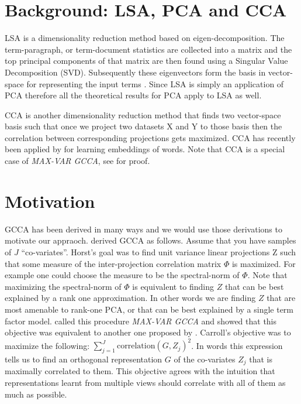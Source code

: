\documentclass[11pt]{article}
\begin{document}
\section{Background: LSA, PCA and CCA}
LSA is a dimensionality reduction method based on
eigen-decomposition. The term-paragraph, or term-document 
statistics are collected into a matrix and the top
principal components of that matrix are then found using a Singular
Value Decomposition (SVD). Subsequently these eigenvectors form 
the basis in vector-space for representing the input terms
\cite{landauer1997solution}. Since LSA is simply an application of PCA
therefore all the theoretical results for PCA apply to LSA as well.

CCA is another dimensionality reduction method that finds two vector-space basis such that
once we project two datasets X and Y to those basis then the
correlation between corresponding projections gets
maximized\cite{hotelling1935the}. CCA has recently been applied by
\cite{dhillon2011multi,dhillon2012two,faruqui2014improving} for
learning embeddings of words. Note that CCA is a special case of
\emph{MAX-VAR GCCA}, see \cite{velden2011on} for proof.

\section{Motivation}
\label{sec:motivation}
GCCA has been derived in many ways and we would use those derivations
to motivate our appraoch. \cite{horst1961generalized} derived GCCA as follows. Assume that you have samples of $J$
``co-variates''. Horst's goal was to find unit variance linear
projections $\textrm{Z}$ such that some measure of the inter-projection correlation
matrix $\Phi$ is maximized. For example one could choose the measure to be
the spectral-norm of $\Phi$. Note that maximizing the spectral-norm of $\Phi$ is equivalent to
finding $Z$ that can be best explained by a rank 
one approximation. In other words we are finding $Z$ that are most
amenable to rank-one PCA, or that can be best explained by a single
term factor model. \cite{kettenring1971canonical} called this procedure
\emph{MAX-VAR GCCA} and showed that this
objective was equivalent to another one proposed by
\cite{carroll1968generalization}. Carroll's objective was to maximize the following: $\sum_{j=1}^J
\textrm{correlation}(G, Z_j)^2$. In
words this expression tells us to find an orthogonal  
representation $G$ of the co-variates $Z_j$ that is maximally
correlated to them. This objective agrees with the intuition that representations
learnt from multiple views should correlate with all of them as much
as possible.
\end{document}
